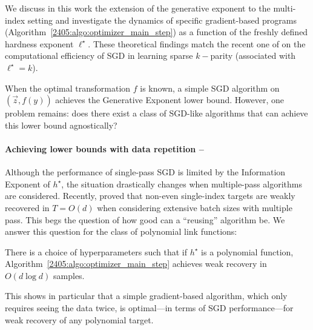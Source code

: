 We discuss in this work the extension of the generative exponent to the multi-index setting and investigate the dynamics of specific gradient-based programs (Algorithm~\ref{2405:algo:optimizer_main_step}) as a function of the freshly defined hardness exponent $\ell^\star$.
These theoretical findings match the recent one of \cite{kou2024matching} on the computational efficiency of SGD in learning sparse $k-$parity (associated with $\ell^\star = k$).

When the optimal transformation $f$ is known, a simple SGD algorithm on $(\vec{z}, f(y))$ achieves the Generative Exponent lower bound. However, one problem remains: does there exist a class of SGD-like algorithms that can achieve this lower bound agnostically?

\paragraph{Achieving lower bounds with data repetition --}

Although the performance of single-pass SGD is limited by the Information Exponent of $h^\star$, the situation drastically changes when multiple-pass algorithms are considered. Recently, \cite{dandi2024benefits} proved that non-even single-index targets are weakly recovered in $T = O(d)$ when considering extensive batch sizes with multiple pass. This begs the question of how good can a ``reusing'' algorithm be. We answer this question for the class of polynomial link functions:
\begin{theorem}[Informal]
    There is a choice of hyperparameters such that if $h^\star$ is a polynomial function, Algorithm~\ref{2405:algo:optimizer_main_step} achieves weak recovery in $O(d\log d)$ samples.
\end{theorem}
This shows in particular that a simple gradient-based algorithm, which only requires seeing the data twice, is optimal---in terms of SGD performance---for weak recovery of any polynomial target.

